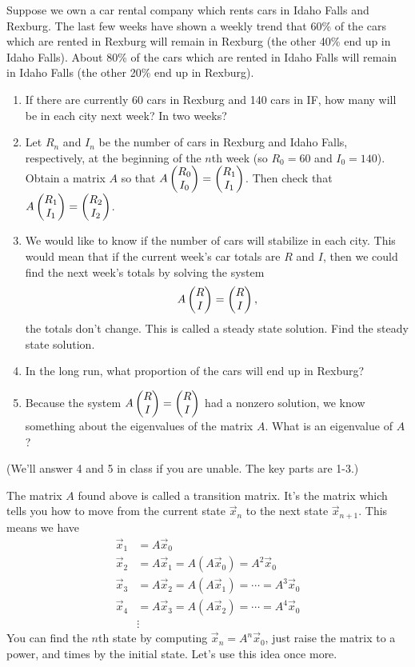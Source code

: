 \begin{problem}
Suppose we own a car rental company which rents cars in Idaho Falls and Rexburg. The last few weeks have shown a weekly trend that 60\% of the cars which are rented in Rexburg will remain in Rexburg (the other 40\% end up in Idaho Falls). About 80\% of the cars which are rented in Idaho Falls will remain in Idaho Falls (the other 20\% end up in Rexburg). 
\begin{enumerate}
 \item If there are currently 60 cars in Rexburg and 140 cars in IF, how many will be in each city next week? In two weeks?
 \item Let $R_n$ and $I_n$ be the number of cars in Rexburg and Idaho Falls, respectively, at the beginning of the $n$th week (so $R_0=60$ and $I_0=140$). Obtain a matrix $A$ so that $A\begin{pmatrix} R_0\\I_0 \end{pmatrix} = \begin{pmatrix} R_1\\I_1 \end{pmatrix}$.  Then check that $A\begin{pmatrix} R_1\\I_1 \end{pmatrix} = \begin{pmatrix} R_2\\I_2 \end{pmatrix}$.
 \item We would like to know if the number of cars will stabilize in each city. This would mean that if the current week's car totals are $R$ and $I$, then we could find the next week's totals by solving the system $$A\begin{pmatrix} R\\I \end{pmatrix} = \begin{pmatrix} R\\I \end{pmatrix},$$  the totals don't change. This is called a steady state solution. Find the steady state solution.  
 \item In the long run, what proportion of the cars will end up in Rexburg?
 \item Because the system $A\begin{pmatrix} R\\I \end{pmatrix} = \begin{pmatrix} R\\I \end{pmatrix}$ had a nonzero solution, we know something about the eigenvalues of the matrix $A$.  What is an eigenvalue of $A$?
\end{enumerate}
(We'll answer 4 and 5 in class if you are unable.  The key parts are 1-3.) 
\end{problem}

The matrix $A$ found above is called a transition matrix.  It's the matrix which tells you how to move from the current state $\vec x_n$ to the next state $\vec x_{n+1}$. This means we have 
\begin{align*}
\vec x_1 &= A\vec x_0\\
\vec x_2 &= A\vec x_1 = A(A\vec x_0) = A^2\vec x_0\\
\vec x_3 &= A\vec x_2 = A(A\vec x_1) =\cdots = A^3\vec x_0\\
\vec x_4 &= A\vec x_3 = A(A\vec x_2) =\cdots = A^4\vec x_0\\
&\vdots
\end{align*}
You can find the $n$th state by computing $\vec x_n = A^n \vec x_0$, just raise the matrix to a power, and times by the initial state. Let's use this idea once more.

